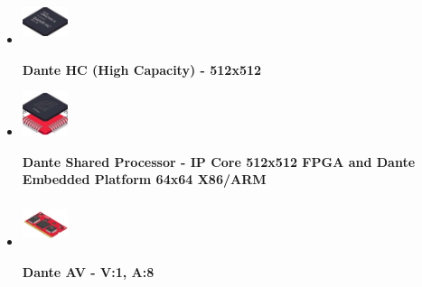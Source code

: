 \begin{itemize}
    \item 
    \begin{minipage}[t]{.2\textwidth}
        \includegraphics[width=50px,height=50px,keepaspectratio]{figures/dante-hc.jpg}
    \end{minipage}%
    \begin{minipage}[t]{.8\textwidth}
        \textbf{Dante HC (High Capacity) - 512x512}
    \end{minipage}

    \item 
    \begin{minipage}[t]{.2\textwidth}
        \includegraphics[width=50px,height=50px,keepaspectratio]{figures/shared-processor.jpg}
    \end{minipage}%
    \begin{minipage}[t]{.8\textwidth}
        \textbf{Dante Shared Processor - IP Core 512x512 FPGA and Dante Embedded Platform 64x64 X86/ARM}
    \end{minipage}

    \item 
    \begin{minipage}[t]{.2\textwidth}
        \includegraphics[width=50px,height=50px,keepaspectratio]{figures/dante-av.jpg}
    \end{minipage}%
    \begin{minipage}[t]{.8\textwidth}
        \textbf{Dante AV - V:1, A:8}
    \end{minipage}
\end{itemize}









